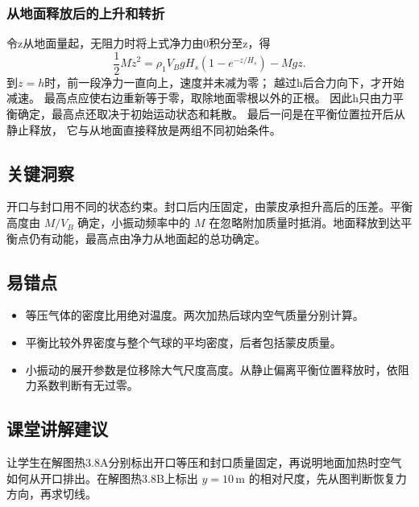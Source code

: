 \documentclass[UTF8,fontset=fandol,a4paper,11pt]{ctexart}
\begin{document}
\subsubsection*{从地面释放后的上升和转折}
令z从地面量起，无阻力时将上式净力由0积分至z，得
\[
\frac12M\dot z^2
=\rho_1V_BgH_s(1-e^{-z/H_s})-Mgz.
\]
到$z=h$时，前一段净力一直向上，速度并未减为零；
越过h后合力向下，才开始减速。
最高点应使右边重新等于零，取除地面零根以外的正根。
因此h只由力平衡确定，最高点还取决于初始运动状态和耗散。
最后一问是在平衡位置拉开后从静止释放，
它与从地面直接释放是两组不同初始条件。




\subsection*{关键洞察}

开口与封口用不同的状态约束。封口后内压固定，由蒙皮承担升高后的压差。平衡高度由 $M/V_B$ 确定，小振动频率中的 $M$ 在忽略附加质量时抵消。地面释放到达平衡点仍有动能，最高点由净力从地面起的总功确定。



\subsection*{易错点}

\begin{itemize}
\item 等压气体的密度比用绝对温度。两次加热后球内空气质量分别计算。
\item 平衡比较外界密度与整个气球的平均密度，后者包括蒙皮质量。
\item 小振动的展开参数是位移除大气尺度高度。从静止偏离平衡位置释放时，依阻力系数判断有无过零。
\end{itemize}



\subsection*{课堂讲解建议}

让学生在解图热3.8A分别标出开口等压和封口质量固定，再说明地面加热时空气如何从开口排出。在解图热3.8B上标出 $y=10$\,m 的相对尺度，先从图判断恢复力方向，再求切线。
\end{document}
